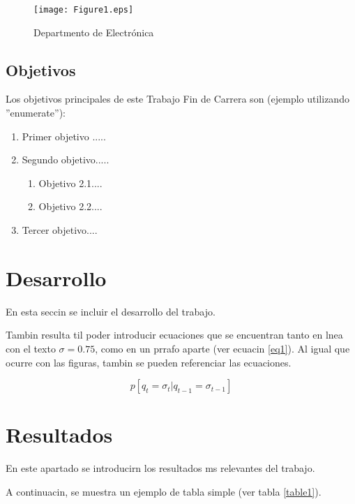 \begin{figure}[h] %
\centering
\texttt{[image: Figure1.eps]}
\caption{Departmento de Electr\'onica}
\label{fig1}
\end{figure}



\subsection{Objetivos}

Los objetivos principales de este Trabajo Fin de Carrera son (ejemplo utilizando ''enumerate''):

\begin{enumerate}
\item Primer objetivo ..... 
\item Segundo objetivo.....
  \begin{enumerate}
  \item Objetivo 2.1....
  \item Objetivo 2.2....
  \end{enumerate}
\item Tercer objetivo....
\end{enumerate}

\section{Desarrollo}

En esta seccin se incluir el desarrollo del trabajo.

Tambin resulta til poder introducir ecuaciones que se encuentran tanto en lnea con el texto $\sigma=0.75$, como en un prrafo aparte (ver ecuacin \ref{eq1}). Al igual que ocurre con las figuras, tambin se pueden referenciar las ecuaciones. 


\begin{equation}
  p[q_t=\sigma_t|q_{t-1}=\sigma_{t-1}]\label{eq1}
\end{equation}



\section{Resultados}
En este apartado se introducirn los resultados ms relevantes del trabajo.

A continuacin, se muestra un ejemplo de tabla simple (ver tabla \ref{table1}).

